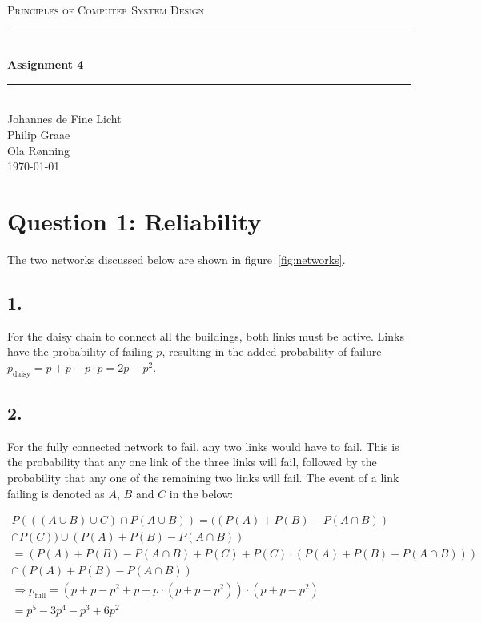 \documentclass[12pt]{article}
\newcommand{\HRule}{\rule{\linewidth}{0.5mm}}
\begin{document}
\begin{center}
\textsc{\LARGE Principles of Computer System Design}\\[0.3cm] %
\HRule \\[0.4cm]
{ \huge \bfseries Assignment 4}
\HRule \\[0.4cm]
\large
Johannes de Fine Licht
\\Philip Graae
\\Ola Rønning
\\\today
\end{center}

\section*{Question 1: Reliability}

The two networks discussed below are shown in figure~\ref{fig:networks}.

\subsection*{1.}

For the daisy chain to connect all the buildings, both links must be active. Links have the probability of failing $p$, resulting in the added probability of failure $p_\text{daisy} = p + p - p\cdot p = 2p - p^2$.

\subsection*{2.}

For the fully connected network to fail, any two links would have to fail. This is the probability that any one link of the three links will fail, followed by the probability that any one of the remaining two links will fail. The event of a link failing is denoted as $A$, $B$ and $C$ in the below:

\begin{align*}
  P(((A\cup B)\cup C)\cap P(A\cup B)) = ((P(A) + P(B) - P(A\cap B)) \\
  \cap P(C)) \cup (P(A) + P(B) - P(A\cap B)) \\
  = (P(A) + P(B) - P(A\cap B) + P(C) + P(C) \cdot (P(A) + P(B) - P(A\cap B))) \\
  \cap (P(A) + P(B) - P(A\cap B)) \\ \Rightarrow
  p_{\text{full}} = (p + p - p^2 + p + p\cdot(p + p - p^2)) \cdot (p + p - p^2)\\
  = p^5 - 3p^4 - p^3 + 6p^2
\end{align*}
\end{document}
